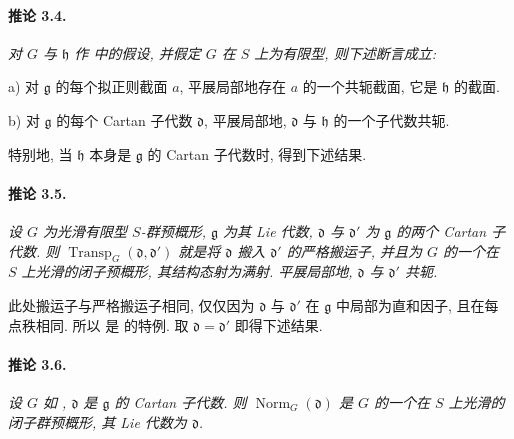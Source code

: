 

\paragraph{\textbf{推论 3.4.}}
{\itshape 对 \(G\) 与 \(\mathfrak h\) 作  中的假设, 并假定 \(G\) 在 \(S\) 上为有限型, 则下述断言成立:

\smallskip
\noindent
\textup{a)}
对 \(\mathfrak g\) 的每个拟正则截面 \(a\), 平展局部地存在 \(a\) 的一个共轭截面, 它是 \(\mathfrak h\) 的截面.

\smallskip
\noindent
\textup{b)}
对 \(\mathfrak g\) 的每个 Cartan 子代数 \(\mathfrak d\), 平展局部地, \(\mathfrak d\) 与 \(\mathfrak h\) 的一个子代数共轭.}

特别地, 当 \(\mathfrak h\) 本身是 \(\mathfrak g\) 的 Cartan 子代数时, 得到下述结果.

\paragraph{\textbf{推论 3.5.}}
{\itshape 设 \(G\) 为光滑有限型 \(S\)-群预概形, \(\mathfrak g\) 为其 Lie 代数, \(\mathfrak d\) 与 \(\mathfrak d'\) 为 \(\mathfrak g\) 的两个 Cartan 子代数. 则 \(\operatorname{Transp}_G(\mathfrak d,\mathfrak d')\) 就是将 \(\mathfrak d\) 搬入 \(\mathfrak d'\) 的严格搬运子, 并且为 \(G\) 的一个在 \(S\) 上光滑的闭子预概形, 其结构态射为满射. 平展局部地, \(\mathfrak d\) 与 \(\mathfrak d'\) 共轭.}

此处搬运子与严格搬运子相同, 仅仅因为 \(\mathfrak d\) 与 \(\mathfrak d'\) 在 \(\mathfrak g\) 中局部为直和因子, 且在每点秩相同. 所以  是  的特例. 取 \(\mathfrak d=\mathfrak d'\) 即得下述结果.

\paragraph{\textbf{推论 3.6.}}
{\itshape 设 \(G\) 如 , \(\mathfrak d\) 是 \(\mathfrak g\) 的 Cartan 子代数. 则 \(\operatorname{Norm}_G(\mathfrak d)\) 是 \(G\) 的一个在 \(S\) 上光滑的闭子群预概形, 其 Lie 代数为 \(\mathfrak d\).}

